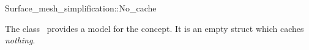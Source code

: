 

\begin{ccRefClass}{Surface_mesh_simplification::No_cache}


\ccDefinition

The class \ccRefName\ provides a model for the  concept.
It is an empty struct which caches {\em nothing}.


\ccIsModel
{}

\ccSeeAlso
{}\\
\\
\\
\\
\\

\end{ccRefClass}


